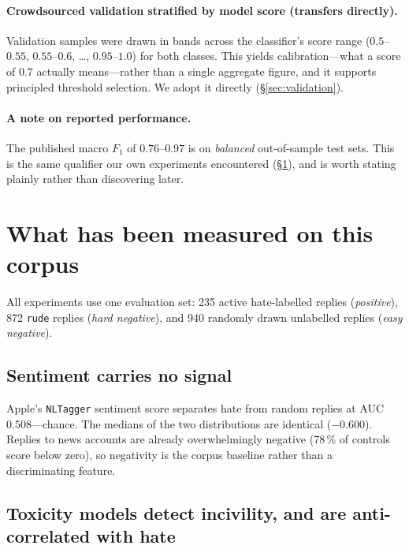 \documentclass[11pt,a4paper]{article}
\begin{document}
\paragraph{Crowdsourced validation stratified by model score (transfers directly).}
Validation samples were drawn in bands across the classifier's score range
($0.5$--$0.55$, $0.55$--$0.6$, \ldots, $0.95$--$1.0$) for both classes. This yields
calibration---what a score of $0.7$ actually means---rather than a single aggregate
figure, and it supports principled threshold selection. We adopt it directly
(\S\ref{sec:validation}).

\paragraph{A note on reported performance.} The published macro $F_1$ of
$0.76$--$0.97$ is on \emph{balanced} out-of-sample test sets. This is the same
qualifier our own experiments encountered (\S\ref{sec:measurements}), and is worth
stating plainly rather than discovering later.

\section{What has been measured on this corpus}
\label{sec:measurements}

All experiments use one evaluation set: 235 active hate-labelled replies
(\emph{positive}), 872 \texttt{rude} replies (\emph{hard negative}), and 940
randomly drawn unlabelled replies (\emph{easy negative}).

\subsection{Sentiment carries no signal}

Apple's \texttt{NLTagger} sentiment score separates hate from random replies at
AUC~$0.508$---chance. The medians of the two distributions are identical
($-0.600$). Replies to news accounts are already overwhelmingly negative (78\,\% of
controls score below zero), so negativity is the corpus baseline rather than a
discriminating feature.

\subsection{Toxicity models detect incivility, and are anti-correlated with hate}
\end{document}
